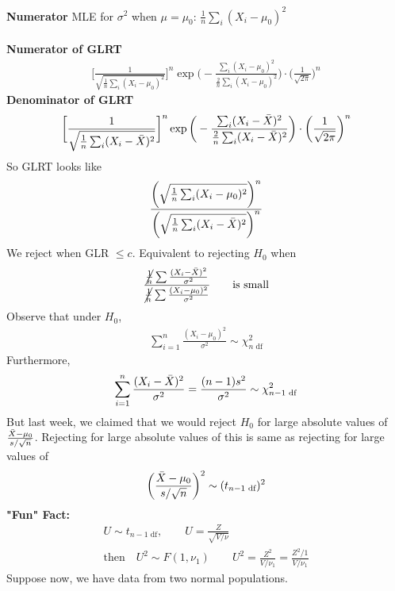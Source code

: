\textbf{Numerator} MLE for $\sigma^2$ when $\mu = \mu_0$: $\frac{1}{n}\sum_i (X_i - \mu_0)^2$\\\\
\textbf{Numerator of GLRT}
\begin{gather*}
	\bigg[ \frac{1}{\sqrt{\frac{1}{n}\sum_i (X_i - \mu_0)^2}} \bigg]^n \exp \bigg(-\frac{\sum_i (X_i - \mu_0)^2}{\frac{2}{n} \sum_i (X_i - \mu_0)^2} \bigg) \cdot \bigg( \frac{1}{\sqrt{2\pi}} \bigg)^n
\end{gather*}
\textbf{Denominator of GLRT}
\begin{gather*}
	\bigg[ \frac{1}{\sqrt{\frac{1}{n}\sum_i (X_i - \bar{X})^2}} \bigg]^n \exp \bigg(-\frac{\sum_i (X_i - \bar{X})^2}{\frac{2}{n} \sum_i (X_i - \bar{X})^2} \bigg) \cdot \bigg( \frac{1}{\sqrt{2\pi}} \bigg)^n
\end{gather*}
So GLRT looks like
\begin{gather*}
	\frac{\bigg( \sqrt{\frac{1}{n}\sum_i (X_i - \mu_0)^2} \bigg)^n}{\bigg( \sqrt{\frac{1}{n}\sum_i (X_i - \bar{X})^2} \bigg)^n}
\end{gather*}
We reject when GLR $\leq c$. Equivalent to rejecting $H_0$ when 
\begin{gather*}
	\frac{\cancel{\frac{1}{n}} \sum \frac{(X_i - \bar{X})^2}{\sigma^2}}{\cancel{\frac{1}{n}} \sum \frac{(X_i - \mu_0)^2}{\sigma^2}} \qquad \text{is small}
\end{gather*}
Observe that under $H_0$, 
\begin{gather*}
	\sum_{i=1}^{n} \frac{(X_i - \mu_0)^2}{\sigma^2} \sim \chi^2_{n \text{ df}}
\end{gather*}
Furthermore,
\begin{gather*}
	\sum_{i=1}^{n} \frac{(X_i - \bar{X})^2}{\sigma^2} = \frac{(n-1)s^2}{\sigma^2} \sim \chi^2_{n-1 \text{ df}}
\end{gather*}
But last week, we claimed that we would reject $H_0$ for large absolute values of $\frac{\bar{X} - \mu_0}{s / \sqrt{n}}$. Rejecting for large absolute values of this is same as rejecting for large values of 
\begin{gather*}
	\bigg( \frac{\bar{X} - \mu_0}{s / \sqrt{n}} \bigg)^2 \sim (t_{n-1 \text{ df}})^2
\end{gather*}
\textbf{"Fun" Fact:}
\begin{gather*}
	U \sim t_{n-1 \text{ df}}, \qquad U = \frac{Z}{\sqrt{V / \nu}} \\
	\text{then} \quad U^2 \sim F(1, \nu_1) \qquad U^2 =  \frac{Z^2}{V / \nu_1}= \frac{Z^2 / 1}{V / \nu_1}
\end{gather*}
Suppose now, we have data from two normal populations. 
